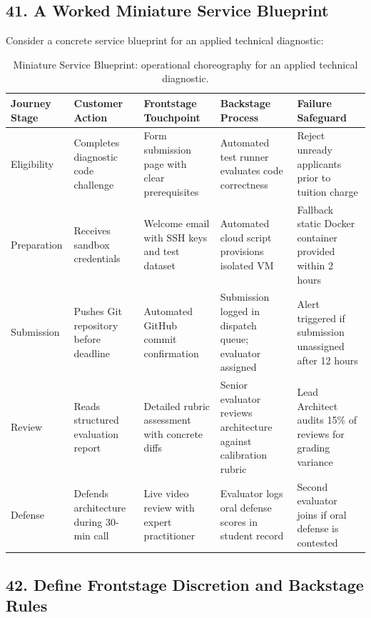 \subsection*{41. A Worked Miniature Service Blueprint}

Consider a concrete service blueprint for an applied technical diagnostic:

\begin{table}[t]
\centering
\small
\begin{tabularx}{\textwidth}{>{\raggedright\arraybackslash}p{2.5cm} >{\raggedright\arraybackslash}p{3.2cm} >{\raggedright\arraybackslash}p{3.5cm} >{\raggedright\arraybackslash}p{3.8cm} >{\raggedright\arraybackslash}X}
\toprule
\textbf{Journey Stage} & \textbf{Customer Action} & \textbf{Frontstage Touchpoint} & \textbf{Backstage Process} & \textbf{Failure Safeguard} \\
\midrule
Eligibility & Completes diagnostic code challenge & Form submission page with clear prerequisites & Automated test runner evaluates code correctness & Reject unready applicants prior to tuition charge \\
Preparation & Receives sandbox credentials & Welcome email with SSH keys and test dataset & Automated cloud script provisions isolated VM & Fallback static Docker container provided within 2 hours \\
Submission & Pushes Git repository before deadline & Automated GitHub commit confirmation & Submission logged in dispatch queue; evaluator assigned & Alert triggered if submission unassigned after 12 hours \\
Review & Reads structured evaluation report & Detailed rubric assessment with concrete diffs & Senior evaluator reviews architecture against calibration rubric & Lead Architect audits 15\% of reviews for grading variance \\
Defense & Defends architecture during 30-min call & Live video review with expert practitioner & Evaluator logs oral defense scores in student record & Second evaluator joins if oral defense is contested \\
\bottomrule
\end{tabularx}
\caption{Miniature Service Blueprint: operational choreography for an applied technical diagnostic.}
\label{tab:ch10-mini-blueprint}
\end{table}

\subsection*{42. Define Frontstage Discretion and Backstage Rules}

